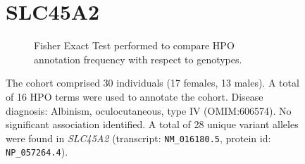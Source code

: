

\begin{figure}[htbp]
    \section*{SLC45A2}
\centering
\begin{subfigure}[b]{0.95\textwidth}
\centering
{}
\captionsetup{justification=raggedright,singlelinecheck=false}
\caption{Fisher Exact Test performed to compare HPO annotation frequency with respect to genotypes. }
\end{subfigure}

\vspace{2em}

\caption{The cohort comprised 30 individuals (17 females, 13 males). A total of 16 HPO terms were used to annotate the cohort. Disease diagnosis: Albinism, oculocutaneous, type IV (OMIM:606574). No significant association identified. A total of 28 unique variant alleles were found in \textit{SLC45A2} (transcript: \texttt{NM\_016180.5}, protein id: \texttt{NP\_057264.4}).}
\end{figure}
